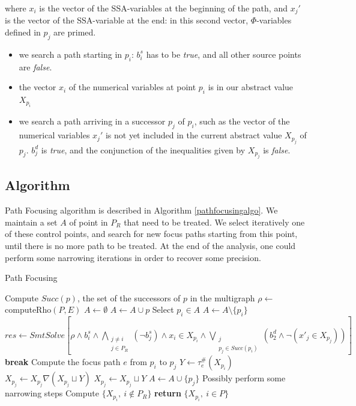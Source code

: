 \documentclass[a4paper,english,titlepage,11pt]{article}
\begin{document}
	where $x_i$ is the vector of the SSA-variables at the beginning of the path,
	and $x_j'$ is the vector of the SSA-variable at the end: in this second
	vector, $\Phi$-variables defined in $p_j$ are primed.

	\begin{itemize}
	\item we search a path starting in $p_i$: $b_i^s$ has to be \emph{true}, and
	all other source points are \emph{false}.
	\item the vector $x_i$ of the numerical variables at point $p_i$ is in our
	abstract value $X_{p_i}$
	\item we search a path arriving in a successor $p_j$ of $p_i$, such as the
	vector of the numerical variables $x_j'$ is not yet included in the current
	abstract value $X_{p_j}$ of $p_j$. $b_j^d$ is \emph{true}, and the
	conjunction of the inequalities given by $X_{p_j}$ is \emph{false}.
	\end{itemize}

	\subsection{Algorithm}
	
	Path Focusing algorithm is described in Algorithm \ref{pathfocusingalgo}.
	We maintain a set $A$ of point in $P_R$ that need to be treated.
	We select iteratively one of these control points, and search for new focus
	paths starting from this point, until there is no more path to be treated.
	At the end of the analysis, one could perform some narrowing iterations in
	order to recover some precision.
\begin{algorithm}
\caption{Path Focusing}\label{pathfocusingalgo}
\begin{algorithmic}[1] 
	\State Compute $Succ(p)$, the set of the successors of $p$ in the multigraph
\EndFor
\State $\rho \gets$ computeRho$(P,E)$
\State $A \gets \emptyset$
	\State $A \gets A \cup p$
\EndFor
{}
	\State Select $p_i \in A$
	\State $A \gets A \setminus \{p_i\}$
		\State $res \gets SmtSolve\left[\rho \wedge b_i^s \wedge
		\displaystyle\bigwedge_{\substack{j\neq i \\
		j\in P_R}} (\neg b_j^s) \wedge x_i \in X_{p_i} \wedge
		\bigvee_{\substack{j \\ p_j\in Succ(p_i)}} \left(b_2^d \wedge \neg (x'_j \in
		X_{p_j})\right)\right]$
			\State \textbf{break}
		\EndIf
		\State Compute the focus path $e$ from $p_i$ to $p_j$
		\State $Y \gets \tau_e^\#(X_{p_i})$
			\State $X_{p_j} \gets X_{p_j} \nabla (X_{p_j} \sqcup Y)$
		\Else
			\State $X_{p_j} \gets X_{p_j} \sqcup Y$
		\EndIf
		\State $A \gets A \cup \{p_j\}$
	\EndWhile
\EndWhile
\State Possibly perform some narrowing steps
\State Compute $\{X_{p_i},\ i \notin P_R\}$
\State \textbf{return} $\{X_{p_i},\ i \in P\}$
\EndProcedure
\end{algorithmic}
\end{algorithm}
\end{document}
